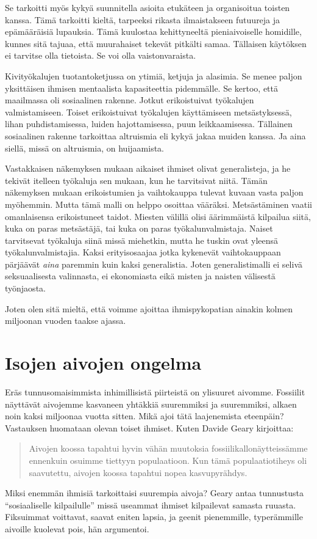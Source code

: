 Se tarkoitti myös kykyä suunnitella asioita etukäteen ja organisoitua toisten kanssa. Tämä tarkoitti kieltä, tarpeeksi rikasta ilmaistakseen futuureja ja epämääräisiä lupauksia. Tämä kuulostaa kehittyneeltä pieniaivoiselle homidille, kunnes sitä tajuaa, että muurahaiset tekevät pitkälti samaa. Tällaisen käytöksen ei tarvitse olla tietoista. Se voi olla vaistonvaraista.

Kivityökalujen tuotantoketjussa on ytimiä, ketjuja ja alasimia. Se menee paljon yksittäisen ihmisen mentaalista kapasiteettia pidemmälle. Se kertoo, että maailmassa oli sosiaalinen rakenne. Jotkut erikoistuivat työkalujen valmistamiseen. Toiset erikoistuivat työkalujen käyttämiseen metsästyksessä, lihan puhdistamisessa, luiden hajottamisessa, puun leikkaamisessa. Tällainen sosiaalinen rakenne tarkoittaa altruismia eli kykyä jakaa muiden kanssa. Ja aina siellä, missä on altruismia, on huijaamista.

Vastakkaisen näkemyksen mukaan aikaiset ihmiset olivat generalisteja, ja he tekivät itelleen työkaluja sen mukaan, kun he tarvitsivat niitä. Tämän näkemyksen mukaan erikoistumien ja vaihtokauppa tulevat kuvaan vasta paljon myöhemmin. Mutta tämä malli on helppo osoittaa vääräksi. Metsästäminen vaatii omanlaisensa erikoistuneet taidot. Miesten välillä olisi äärimmäistä kilpailua siitä, kuka on paras metsästäjä, tai kuka on paras työkalunvalmistaja. Naiset tarvitsevat työkaluja siinä missä miehetkin, mutta he tuskin ovat yleensä työkalunvalmistajia. Kaksi erityisosaajaa jotka kykenevät vaihtokauppaan pärjäävät \emph{aina} paremmin kuin kaksi generalistia. Joten generalistimalli ei selivä seksuaalisesta valinnasta, ei ekonomiasta eikä misten ja naisten välisestä työnjaosta.

Joten olen sitä mieltä, että voimme ajoittaa ihmispykopatian ainakin kolmen miljoonan vuoden taakse ajassa.

\section{Isojen aivojen ongelma}

Eräs tunnusomaisimmista inhimillisistä piirteistä on ylisuuret aivomme. Fossiilit näyttävät aivojemme kasvaneen yhtäkkiä suuremmiksi ja suuremmiksi, alkaen noin kaksi miljoonaa vuotta sitten. Mikä ajoi tätä laajenemista eteenpäin? Vastauksen huomataan olevan toiset ihmiset. Kuten Davide Geary kirjoittaa:
\begin{quotation}
\noindent Aivojen koossa tapahtui hyvin vähän muutoksia fossiilikallonäytteissämme ennenkuin osuimme tiettyyn populaatioon. Kun tämä populaatiotiheys oli saavutettu, aivojen koossa tapahtui nopea kasvupyrähdys.
\end{quotation}
Miksi enemmän ihmisiä tarkoittaisi suurempia aivoja? Geary antaa tunnustusta ``sosiaaliselle kilpailulle\vmq{,}'' missä useammat ihmiset kilpailevat samasta ruuasta. Fiksuimmat voittavat, saavat eniten lapsia, ja geenit pienemmille, typerämmille aivoille kuolevat pois, hän argumentoi.

